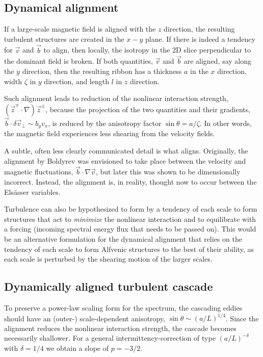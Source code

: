 \documentclass[usenatbib,twocolumn]{aastex63}
\begin{document}
\begin{appendix}
\subsection{Dynamical alignment}

If a large-scale magnetic field is aligned with the $z$ direction, the resulting turbulent structures are created in the $x-y$ plane.
If there is indeed a tendency for $\vec{v}$ and $\vec{b}$ to align, then locally, the isotropy in the 2D slice perpendicular to the dominant field is broken.
If both quantities, $\vec{v}$ and $\vec{b}$ are aligned, say along the $y$ direction, then the resulting ribbon has a thickness $a$ in the $x$ direction, width $\zeta$ in $y$ direction, and length $l$ in $z$ direction.

Such alignment leads to reduction of the nonlinear interaction strength, $(\vec{z}^\mp \cdot \nabla)\vec{z}^\pm$, because the projection of the two quantities and their gradients, $\vec{b}\cdot\delta\vec{v}_\perp \sim b_y v_x$, is reduced by the anisotropy factor $\sin\theta = a/\zeta$.
In other words, the magnetic field experiences less shearing from the velocity fields.

A subtle, often less clearly communicated detail is what aligns.
Originally, the alignment by Boldyrev was envisioned to take place between the velocity and magnetic fluctuations, $\vec{b} \cdot \nabla \vec{v}$, but later this was shown to be dimensionally incorrect. 
Instead, the alignment is, in reality, thought now to occur between the Els\"asser  variables. %


Turbulence can also be hypothesized to form by a tendency of each scale to form structures that act to \textit{minimize} the nonlinear interaction and to equilibrate with a forcing (incoming spectral energy flux that needs to be passed on).
This would be an alternative formulation for the dynamical alignment that relies on the tendency of each scale to form Alfvenic structures to the best of their ability, as each scale is perturbed by the shearing motion of the larger scales. 


\subsection{Dynamically aligned turbulent cascade}

To preserve a power-law scaling form for the spectrum, the cascading eddies should have an (outer-) scale-dependent anisotropy, $\sin\theta \sim (a/L)^{1/4}$.
Since the alignment reduces the nonlinear interaction strength, the cascade becomes necessarily shallower.
For a general intermittency-correction of type $(a/L)^{-\delta}$ with $\delta = 1/4$ we obtain a slope of $p = -3/2$.


\end{appendix}
\end{document}
